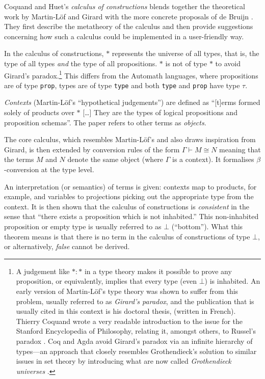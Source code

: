 \documentclass[12pt,toc=bibliography,numbers=noendperiod,
               footnotes=multiple,twoside]{scrartcl}
\begin{document}
Coquand and Huet's \emph{calculus of constructions} blends together the theoretical work by Martin-Löf and Girard with the more concrete proposals of de Bruijn \autocite{coquand_calculus_1988}. They first describe the metatheory of the calculus and then provide suggestions concerning how such a calculus could be implemented in a user-friendly way.

In the calculus of constructions, \(*\) represents the universe of all types, that is, the type of all types \emph{and} the type of all propositions. \(*\) is not of type \(*\) to avoid Girard's paradox.\footnote{A judgement like \(* : *\) in a type theory makes it possible to prove any proposition, or equivalently, implies that every type (even \(\bot\)) is inhabited. An early version of Martin-Löf's type theory was shown to suffer from this problem, usually referred to as \emph{Girard's paradox}, and the publication that is usually cited in this context is his doctoral thesis, \textcite{girard_interpretation_1972} (written in French). Thierry Coquand wrote a very readable introduction to the issue for the Stanford Encyclopedia of Philosophy, relating it, amongst others, to Russel's paradox \autocite{coquand_type_2014}. Coq and Agda avoid Girard's paradox via an infinite hierarchy of types---an approach that closely resembles Grothendieck's solution to similar issues in set theory by introducing what are now called \emph{Grothendieck universes} \autocite{artin_orie_1972}.} This differs from the Automath languages, where propositions are of type \texttt{prop}, types are of type \texttt{type} and both \texttt{type} and \texttt{prop} have type \(\tau\).

\emph{Contexts} (Martin-Löf's \enquote{hypothetical judgements}) are defined as \enquote{[t]erms formed solely of products over \(*\) [\dots] They are the types of logical propositions and proposition schemas}. The paper refers to other terms as \emph{objects}.

The core calculus, which resembles Martin-Löf's and also draws inspiration from Girard, is then extended by conversion rules of the form \(\Gamma \vdash M \cong N\) meaning that the terms \(M\) and \(N\) denote the same object (where \(\Gamma\) is a context). It formalises \(\beta\)-conversion at the type level.

An interpretation (or semantics) of terms is given: contexts map to products, for example, and variables to projections picking out the appropriate type from the context. It is then shown that the calculus of constructions is \emph{consistent} in the sense that \enquote{there exists a proposition which is not inhabited.} This non-inhabited proposition or empty type is usually referred to as \(\bot\) (\enquote{bottom}). What this theorem means is that there is no term in the calculus of constructions of type \(\bot\), or alternatively, \emph{false} cannot be derived.
\end{document}
